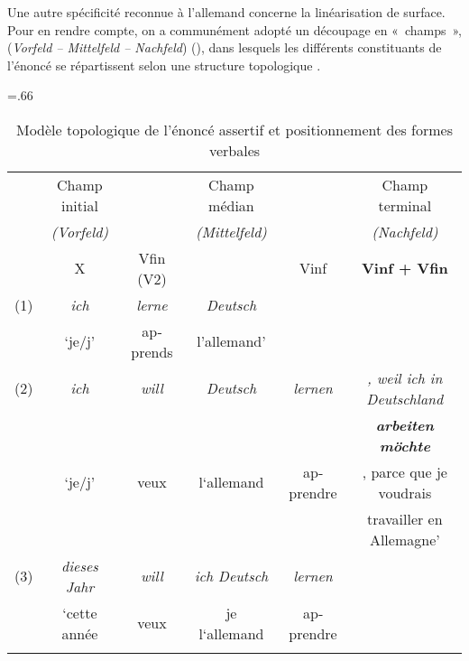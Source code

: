 \documentclass[output=paper]{langscibook}
\begin{document}
\begin{otherlanguage}{french}
\begin{sloppypar}
Une autre spécificité reconnue à l’allemand concerne la linéarisation de surface. Pour en rendre compte, on a communément adopté un découpage en «~champs~», (\textit{Vorfeld – Mittelfeld – Nachfeld}) (), dans lesquels les différents constituants de l’énoncé se répartissent selon une structure topologique \citep{Wöllstein2014}.
\end{sloppypar}

\begin{table}
\tabcolsep=.66\tabcolsep\small%
\begin{tabular}{l@{~}ccccc}
\lsptoprule
     & Champ initial &  & Champ médian &  & Champ terminal\\
     & \textit{(Vorfeld)} &  & \textit{(Mittelfeld)} &   & \textit{(Nachfeld)}\\\midrule
     & X & Vfin (V2) & & Vinf & \textbf{Vinf + Vfin}\\\midrule
(1)  & \textit{ich} & \textit{lerne} & \textit{Deutsch} & & \\\relax
     & {`je/j'} & apprends & {l'allemand'} & & \\\addlinespace\addlinespace
(2)  & \textit{ich} & \textit{will} & \textit{Deutsch} & \textit{lernen} & \textit{, weil ich in Deutschland}\\\relax
     &  & & & & \textit{\textbf{arbeiten möchte}}\\
     &  {`je/j'} & veux & l`allemand & apprendre & , parce que je voudrais \\
     &  & & & & {travailler en Allemagne'} \\\addlinespace\addlinespace
(3)  & \textit{dieses Jahr} & \textit{will} & \textit{ich Deutsch} & \textit{lernen} & \\\relax
     & `cette année & veux & je l`allemand & apprendre & \\
\lspbottomrule
\end{tabular}
\caption{Modèle topologique de l’énoncé assertif et positionnement des formes verbales\label{tab:felce:1}}
\end{table}


\end{otherlanguage}
\end{document}

